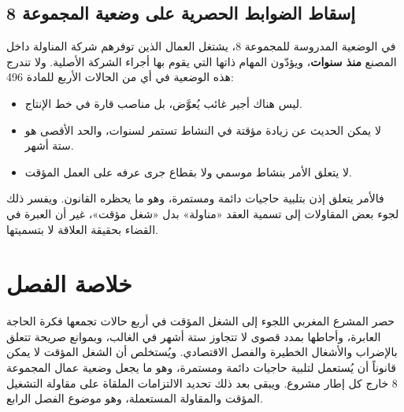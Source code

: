 \subsection{إسقاط الضوابط الحصرية على وضعية المجموعة 8}
في الوضعية المدروسة للمجموعة \textenglish{8}، يشتغل العمال الذين توفرهم شركة المناولة داخل المصنع \textbf{منذ سنوات}، ويؤدّون المهام ذاتها التي يقوم بها أجراء الشركة الأصلية. ولا تندرج هذه الوضعية في أي من الحالات الأربع للمادة \textenglish{496}:
\begin{itemize}[leftmargin=*, itemsep=4pt]
    \item ليس هناك أجير غائب يُعوَّض، بل مناصب قارة في خط الإنتاج.
    \item لا يمكن الحديث عن زيادة مؤقتة في النشاط تستمر لسنوات، والحد الأقصى هو ستة أشهر.
    \item لا يتعلق الأمر بنشاط موسمي ولا بقطاع جرى عرفه على العمل المؤقت.
\end{itemize}
فالأمر يتعلق إذن بتلبية حاجيات دائمة ومستمرة، وهو ما يحظره القانون. ويفسر ذلك لجوء بعض المقاولات إلى تسمية العقد «مناولة» بدل «شغل مؤقت»، غير أن العبرة في القضاء بحقيقة العلاقة لا بتسميتها.

\section*{خلاصة الفصل}

حصر المشرع المغربي اللجوء إلى الشغل المؤقت في أربع حالات تجمعها فكرة الحاجة العابرة، وأحاطها بمدد قصوى لا تتجاوز ستة أشهر في الغالب، وبموانع صريحة تتعلق بالإضراب والأشغال الخطيرة والفصل الاقتصادي. ويُستخلص أن الشغل المؤقت لا يمكن قانوناً أن يُستعمل لتلبية حاجيات دائمة ومستمرة، وهو ما يجعل وضعية عمال المجموعة \textenglish{8} خارج كل إطار مشروع. ويبقى بعد ذلك تحديد الالتزامات الملقاة على مقاولة التشغيل المؤقت والمقاولة المستعملة، وهو موضوع الفصل الرابع.
